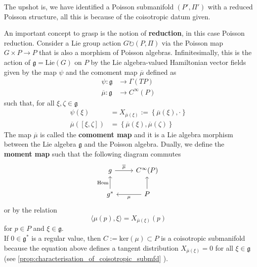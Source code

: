 The upshot is, we have identified a Poisson submanifold $(P', \Pi')$ with a reduced Poisson structure, all this is because of the coisotropic datum given.



An important concept to grasp is the notion of \textbf{reduction}, in this case Poisson reduction.
Consider a Lie group action $G \circlearrowright (P, \Pi)$ via the Poisson map $G \times P \rightarrow P$ that is also a morphism of Poisson algebras. 
Infinitesimally, this is the action of $\mathfrak{g} = \mathrm{Lie}(G)$ on $P$ by the Lie algebra-valued Hamiltonian vector fields given by the map $\psi$ and the comoment map $\overline{\mu}$ defined as
\begin{align*}
\psi: \mathfrak{g} &\rightarrow \Gamma(TP)\\
\overline{\mu} : \mathfrak{g} & \rightarrow C^\infty(P)
\end{align*}
such that, for all $\xi,\zeta \in \mathfrak{g}$
\begin{align}
\psi(\xi) &= X_{\overline{\mu}(\xi)} := \left\{ \overline{\mu}(\xi), \cdot \right\}    \\
    \overline{\mu}([\xi, \zeta]) &= \left\{ \overline{\mu}(\xi), \overline{\mu}(\zeta) \right\}
\end{align}
The map $\overline{\mu}$ is called the \textbf{comoment map} and it is a Lie algebra morphism between the Lie algebra $\mathfrak{g}$ and the Poisson algebra.
Dually, we define the \textbf{moment map} such that the following diagram commutes
\begin{equation}
    \begin{tikzcd}
        g \arrow["\overline{\mu}"]{r}&C^\infty(P)\\
        g^* \arrow["\mathrm{Hom}"]{u}&P \arrow[]{u} \arrow["\mu"]{l}
    \end{tikzcd}
\end{equation}
or by the relation
\begin{equation}
    \langle \mu(p), \xi \rangle = X_{\overline{\mu}(\xi)}(p)
\end{equation}
for $p \in P$ and $\xi \in \mathfrak{g}$.\\
% 
If $0 \in \mathfrak{g}^*$ is a regular value, then $C := \mathrm{ker}(\mu) \subset P$ is a coisotropic submanifold because the equation above defines a tangent distribution $X_{\overline{\mu}(\xi)} = 0$ for all $\xi \in \mathfrak{g}$ (see \cref{prop:characterisation_of_coisotropic_submfd} ).
